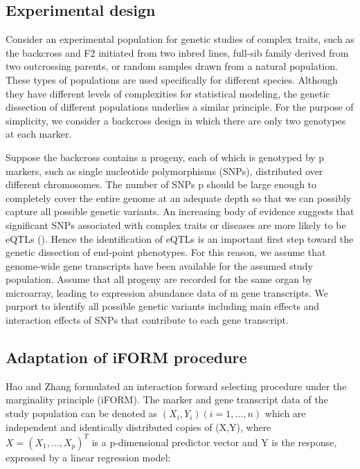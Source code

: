 \documentclass[11pt,]{book}
\theoremstyle{definition}
\theoremstyle{definition}
\theoremstyle{remark}
\begin{document}
\subsection{Experimental design}\label{experimental-design}

Consider an experimental population for genetic studies of complex
traits, such as the backcross and F2 initiated from two inbred lines,
full-sib family derived from two outcrossing parents, or random samples
drawn from a natural population. These types of populations are used
specifically for different species. Although they have different levels
of complexities for statistical modeling, the genetic dissection of
different populations underlies a similar principle. For the purpose of
simplicity, we consider a backcross design in which there are only two
genotypes at each marker.

Suppose the backcross contains n progeny, each of which is genotyped by
p markers, such as single nucleotide polymorphisms (SNPs), distributed
over different chromosomes. The number of SNPs p should be large enough
to completely cover the entire genome at an adequate depth so that we
can possibly capture all possible genetic variants. An increasing body
of evidence suggests that significant SNPs associated with complex
traits or diseases are more likely to be eQTLs (\cite{li2013using}).
Hence the identification of eQTLs is an important first step toward the
genetic dissection of end-point phenotypes. For this reason, we assume
that genome-wide gene transcripts have been available for the assumed
study population. Assume that all progeny are recorded for the same
organ by microarray, leading to expression abundance data of m gene
transcripts. We purport to identify all possible genetic variants
including main effects and interaction effects of SNPs that contribute
to each gene transcript.

\subsection{Adaptation of iFORM
procedure}\label{adaptation-of-iform-procedure}

Hao and Zhang \cite{hao2014interaction} formulated an interaction
forward selecting procedure under the marginality principle (iFORM). The
marker and gene transcript data of the study population can be denoted
as \((X_i,Y_i) (i = 1,\dots, n)\) which are independent and identically
distributed copies of (X,Y), where \(X = (X_1,\dots,X_p )^T\) is a
p-dimensional predictor vector and Y is the response, expressed by a
linear regression model:
\end{document}
